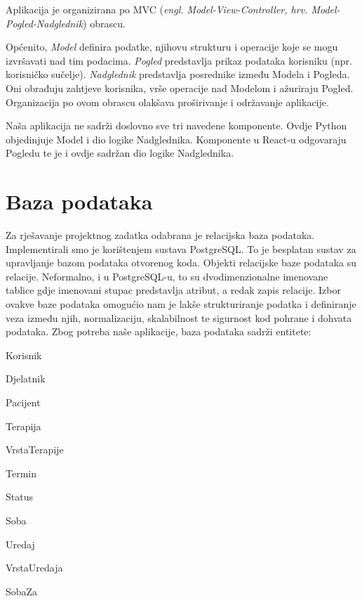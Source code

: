 Aplikacija je organizirana po MVC (\textit{engl. Model-View-Controller, hrv. Model-Pogled-Nadglednik}) obrascu.  

Općenito, \textit{Model} definira podatke, njihovu strukturu i operacije koje se mogu izvršavati nad tim podacima. \textit{Pogled} predstavlja prikaz podataka korisniku (npr. korisničko sučelje).
\textit{Nadglednik} predstavlja posrednike između Modela i Pogleda. Oni obrađuju zahtjeve korisnika, vrše operacije nad Modelom i ažuriraju Pogled. Organizacija po ovom obrascu olakšava proširivanje i održavanje aplikacije.

Naša aplikacija ne sadrži doslovno sve tri navedene komponente. Ovdje Python objedinjuje Model i dio logike Nadglednika. Komponente u React-u odgovaraju Pogledu te je i ovdje sadržan dio logike Nadglednika.

				
		\section{Baza podataka}

Za rješavanje projektnog zadatka odabrana je relacijska baza podataka. Implementirali smo je korištenjem sustava PostgreSQL. To je besplatan sustav za upravljanje bazom podataka otvorenog koda. Objekti relacijske baze podataka su relacije. Neformalno, i u PostgreSQL-u, to su dvodimenzionalne imenovane tablice gdje imenovani stupac predstavlja atribut, a redak zapis relacije. Izbor ovakve baze podataka omogućio nam je lakše strukturiranje podatka i definiranje veza između njih, normalizaciju, skalabilnost te sigurnost kod pohrane i dohvata podataka. 
Zbog potreba naše aplikacije, baza podataka sadrži entitete:

        \begin{packed_item}
		\item 	\textnormal{Korisnik}
		\item 	\textnormal{Djelatnik}
        \item 	\textnormal{Pacijent}
        \item 	\textnormal{Terapija}
        \item 	\textnormal{VrstaTerapije}	
        \item 	\textnormal{Termin}			
        \item 	\textnormal{Status}		
        \item 	\textnormal{Soba}	
        \item 	\textnormal{Uredaj}
        \item 	\textnormal{VrstaUredaja}
        \item    SobaZa
                   				
	 \end{packed_item}

